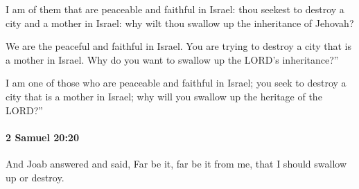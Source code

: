 			\begin{versebox}
					\item[BHS] 
					\item[ASV] I am of them that are peaceable and faithful in Israel: thou seekest to destroy a city and a mother in Israel: why wilt thou swallow up the inheritance of Jehovah?
					\item[NIV] We are the peaceful and faithful in Israel. You are trying to destroy a city that is a mother in Israel. Why do you want to swallow up the LORD’s inheritance?”
					\item[NRSV] I am one of those who are peaceable and faithful in Israel; you seek to destroy a city that is a mother in Israel; why will you swallow up the heritage of the LORD?”
			\end{versebox}

		\paragraph{2 Samuel 20:20} %
			\label{2SAMUEL-20-20}

			And Joab answered and said, Far be it, far be it from me, that I should swallow up or destroy.

